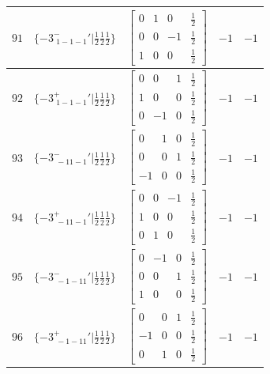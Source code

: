 \documentclass[fleqn,8pt]{jsarticle}
\begin{document}
\begin{longtable}{ccccc}
$ 91 $ & $ \{-3^{-}_{\,\,1-1-1}{}'|\frac{1}{2} \frac{1}{2} \frac{1}{2}\} $ & $ \begin{bmatrix} 0 & 1 & 0 & \frac{1}{2} \\ 0 & 0 & -1 & \frac{1}{2} \\ 1 & 0 & 0 & \frac{1}{2} \end{bmatrix} $ & $ -1 $ & $ -1 $ \\ \hline
$ 92 $ & $ \{-3^{+}_{\,\,1-1-1}{}'|\frac{1}{2} \frac{1}{2} \frac{1}{2}\} $ & $ \begin{bmatrix} 0 & 0 & 1 & \frac{1}{2} \\ 1 & 0 & 0 & \frac{1}{2} \\ 0 & -1 & 0 & \frac{1}{2} \end{bmatrix} $ & $ -1 $ & $ -1 $ \\ \hline
$ 93 $ & $ \{-3^{-}_{\,\,-11-1}{}'|\frac{1}{2} \frac{1}{2} \frac{1}{2}\} $ & $ \begin{bmatrix} 0 & 1 & 0 & \frac{1}{2} \\ 0 & 0 & 1 & \frac{1}{2} \\ -1 & 0 & 0 & \frac{1}{2} \end{bmatrix} $ & $ -1 $ & $ -1 $ \\ \hline
$ 94 $ & $ \{-3^{+}_{\,\,-11-1}{}'|\frac{1}{2} \frac{1}{2} \frac{1}{2}\} $ & $ \begin{bmatrix} 0 & 0 & -1 & \frac{1}{2} \\ 1 & 0 & 0 & \frac{1}{2} \\ 0 & 1 & 0 & \frac{1}{2} \end{bmatrix} $ & $ -1 $ & $ -1 $ \\ \hline
$ 95 $ & $ \{-3^{-}_{\,\,-1-11}{}'|\frac{1}{2} \frac{1}{2} \frac{1}{2}\} $ & $ \begin{bmatrix} 0 & -1 & 0 & \frac{1}{2} \\ 0 & 0 & 1 & \frac{1}{2} \\ 1 & 0 & 0 & \frac{1}{2} \end{bmatrix} $ & $ -1 $ & $ -1 $ \\ \hline
$ 96 $ & $ \{-3^{+}_{\,\,-1-11}{}'|\frac{1}{2} \frac{1}{2} \frac{1}{2}\} $ & $ \begin{bmatrix} 0 & 0 & 1 & \frac{1}{2} \\ -1 & 0 & 0 & \frac{1}{2} \\ 0 & 1 & 0 & \frac{1}{2} \end{bmatrix} $ & $ -1 $ & $ -1 $ \\
\end{longtable}
\end{document}
